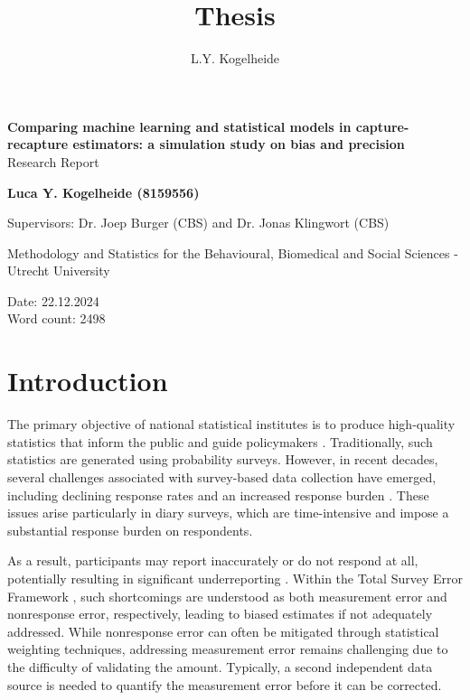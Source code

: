 \documentclass[12pt, a4paper]{article}
\title{Thesis}
\author{L.Y. Kogelheide}
\begin{document}
    \begin{center}

        \Large
        \textbf{Comparing machine learning and statistical models in capture-recapture estimators: a simulation study on bias and precision}
        \\
        \vspace{1cm}
        Research Report

        \vspace{1.5cm}
        \Large
        \textbf{Luca Y. Kogelheide (8159556)}

        \vspace{0.5cm}
        \large
        Supervisors: Dr. Joep Burger (CBS) and Dr. Jonas Klingwort (CBS)

        \vspace{1.5cm}
        Methodology and Statistics for the Behavioural, Biomedical and Social Sciences - Utrecht University

        \vspace{2cm}
        Date: 22.12.2024 \\
        Word count: 2498

        \thispagestyle{empty}

        \newpage
    
    \end{center}

\newpage

\setcounter{page}{1}

\section{Introduction}
\noindent The primary objective of national statistical institutes is to produce high-quality statistics that inform the public and guide policymakers \parencite{Eurostat}. Traditionally, such statistics are generated using probability surveys. However, in recent decades, several challenges associated with survey-based data collection have emerged, including declining response rates \parencite{de2018international, Meyer2015} and an increased response burden \parencite{richardson1996nonresponse, hu2017nonresponse}. These issues arise particularly in diary surveys, which are time-intensive and impose a substantial response burden on respondents. \par

As a result, participants may report inaccurately or do not respond at all, potentially resulting in significant underreporting \parencite{ashley2009underreporting, schmidt2014consumers}. Within the Total Survey Error Framework \parencite{biemer2010total}, such shortcomings are understood as both measurement error and nonresponse error, respectively, leading to biased estimates if not adequately addressed. While nonresponse error can often be mitigated through statistical weighting techniques, addressing measurement error remains challenging due to the difficulty of validating the amount. Typically, a second independent data source is needed to quantify the measurement error before it can be corrected. \par
\end{document}
